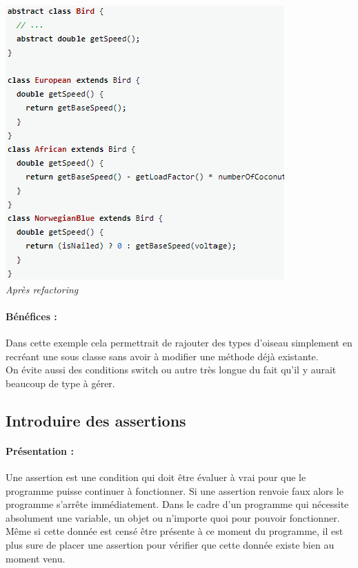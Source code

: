 \documentclass[a4paper,twoside,12pt,openright]{report}
\begin{document}
\begin{center}
\includegraphics[scale=1]{Image/ReplaceConditionalPoly2.png}\\
\itshape{Après refactoring \cite{ref5}}
\end{center}

\paragraph{Bénéfices :}
Dans cette exemple cela permettrait de rajouter des types d'oiseau simplement en recréant une sous classe sans avoir à modifier une méthode déjà existante.\\
On évite aussi des conditions switch ou autre très longue du fait qu'il y aurait beaucoup de type à gérer.

\subsection{Introduire des assertions}
\paragraph{Présentation :}
Une assertion est une condition qui doit être évaluer à vrai pour que le programme puisse continuer à fonctionner. Si une assertion renvoie faux alors le programme s'arrête immédiatement.
Dans le cadre d'un programme qui nécessite absolument une variable, un objet ou n'importe quoi pour pouvoir fonctionner. Même si cette donnée est censé être présente à ce moment du programme, il est plus sure de placer une assertion pour vérifier que cette donnée existe bien au moment venu.
\end{document}
